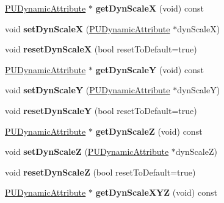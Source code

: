 \begin{DoxyCompactItemize}
\hyperlink{classPUDynamicAttribute}{P\+U\+Dynamic\+Attribute} $\ast$ {\bfseries get\+Dyn\+ScaleX} (void) const
\item 
\mbox{\label{classPUScaleAffector_a50ec0603cc2abd9f68e8d61a8eb4ed63}} 
void {\bfseries set\+Dyn\+ScaleX} (\hyperlink{classPUDynamicAttribute}{P\+U\+Dynamic\+Attribute} $\ast$dyn\+ScaleX)
\item 
\mbox{\label{classPUScaleAffector_a2abb41b2f5672e3f1754de2c1d3e7899}} 
void {\bfseries reset\+Dyn\+ScaleX} (bool reset\+To\+Default=true)
\item 
\mbox{\label{classPUScaleAffector_a6e2936e17ecc697671fdc4f11070c5ba}} 
\hyperlink{classPUDynamicAttribute}{P\+U\+Dynamic\+Attribute} $\ast$ {\bfseries get\+Dyn\+ScaleY} (void) const
\item 
\mbox{\label{classPUScaleAffector_ae9dfc4db150fc14bee01cbc77f2a8499}} 
void {\bfseries set\+Dyn\+ScaleY} (\hyperlink{classPUDynamicAttribute}{P\+U\+Dynamic\+Attribute} $\ast$dyn\+ScaleY)
\item 
\mbox{\label{classPUScaleAffector_ab0d0e3bbc8465a8820644b2ed2e40357}} 
void {\bfseries reset\+Dyn\+ScaleY} (bool reset\+To\+Default=true)
\item 
\mbox{\label{classPUScaleAffector_a86ea805d84cde79cbfdcc7655792079c}} 
\hyperlink{classPUDynamicAttribute}{P\+U\+Dynamic\+Attribute} $\ast$ {\bfseries get\+Dyn\+ScaleZ} (void) const
\item 
\mbox{\label{classPUScaleAffector_a49c0b19bd8af908ef0f315165787e2c6}} 
void {\bfseries set\+Dyn\+ScaleZ} (\hyperlink{classPUDynamicAttribute}{P\+U\+Dynamic\+Attribute} $\ast$dyn\+ScaleZ)
\item 
\mbox{\label{classPUScaleAffector_aed6e5af2969af77535e5b9a2e29302c3}} 
void {\bfseries reset\+Dyn\+ScaleZ} (bool reset\+To\+Default=true)
\item 
\mbox{\label{classPUScaleAffector_a7c9188f868695e55d6ad744e969fabc2}} 
\hyperlink{classPUDynamicAttribute}{P\+U\+Dynamic\+Attribute} $\ast$ {\bfseries get\+Dyn\+Scale\+X\+YZ} (void) const

\end{DoxyCompactItemize}
